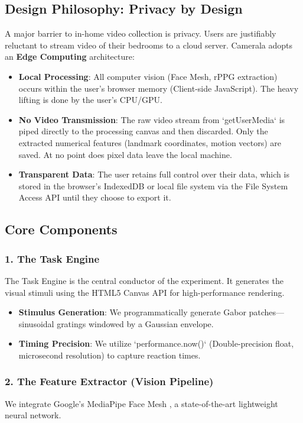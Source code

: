 \documentclass[journal]{IEEEtran}
\begin{document}
\subsection{Design Philosophy: Privacy by Design}
A major barrier to in-home video collection is privacy. Users are justifiably reluctant to stream video of their bedrooms to a cloud server. Camerala adopts an \textbf{Edge Computing} architecture:
\begin{itemize}
    \item \textbf{Local Processing}: All computer vision (Face Mesh, rPPG extraction) occurs within the user's browser memory (Client-side JavaScript). The heavy lifting is done by the user's CPU/GPU.
    \item \textbf{No Video Transmission}: The raw video stream from `getUserMedia` is piped directly to the processing canvas and then discarded. Only the extracted numerical features (landmark coordinates, motion vectors) are saved. At no point does pixel data leave the local machine.
    \item \textbf{Transparent Data}: The user retains full control over their data, which is stored in the browser's IndexedDB or local file system via the File System Access API until they choose to export it.
\end{itemize}

\subsection{Core Components}

\subsubsection{1. The Task Engine}
The Task Engine is the central conductor of the experiment. It generates the visual stimuli using the HTML5 Canvas API for high-performance rendering.
\begin{itemize}
    \item \textbf{Stimulus Generation}: We programmatically generate Gabor patches—sinusoidal gratings windowed by a Gaussian envelope.
    \item \textbf{Timing Precision}: We utilize `performance.now()` (Double-precision float, microsecond resolution) to capture reaction times.
\end{itemize}

\subsubsection{2. The Feature Extractor (Vision Pipeline)}
We integrate Google's MediaPipe Face Mesh \cite{mediapipe}, a state-of-the-art lightweight neural network.
\end{document}
